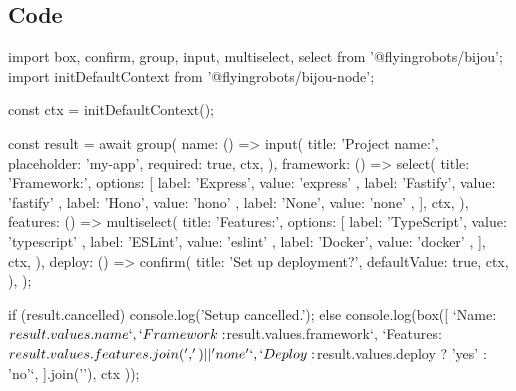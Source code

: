 \begin{center}
\end{center}

\subsection{Code}\label{record-015-code-1}

\begin{CodeBlock}
import { box, confirm, group, input, multiselect, select } from '@flyingrobots/bijou';
import { initDefaultContext } from '@flyingrobots/bijou-node';

const ctx = initDefaultContext();

const result = await group({
  name: () => input({
    title: 'Project name:',
    placeholder: 'my-app',
    required: true,
    ctx,
  }),
  framework: () => select({
    title: 'Framework:',
    options: [
      { label: 'Express', value: 'express' },
      { label: 'Fastify', value: 'fastify' },
      { label: 'Hono', value: 'hono' },
      { label: 'None', value: 'none' },
    ],
    ctx,
  }),
  features: () => multiselect({
    title: 'Features:',
    options: [
      { label: 'TypeScript', value: 'typescript' },
      { label: 'ESLint', value: 'eslint' },
      { label: 'Docker', value: 'docker' },
    ],
    ctx,
  }),
  deploy: () => confirm({
    title: 'Set up deployment?',
    defaultValue: true,
    ctx,
  }),
});

if (result.cancelled) {
  console.log('Setup cancelled.');
} else {
  console.log(box([
    `Name: ${result.values.name}`,
    `Framework: ${result.values.framework}`,
    `Features: ${result.values.features.join(', ') || 'none'}`,
    `Deploy: ${result.values.deploy ? 'yes' : 'no'}`,
  ].join('\n'), { ctx }));
}
\end{CodeBlock}

